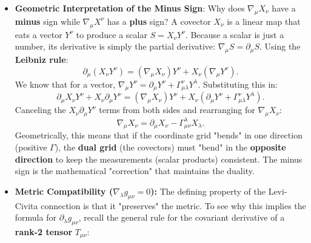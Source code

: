 \begin{solution}
\begin{itemize}
    \item \textbf{Geometric Interpretation of the Minus Sign}:
    Why does $\nabla_\mu X_\nu$ have a \textbf{minus} sign while $\nabla_\mu X^\nu$ has a \textbf{plus} sign? 
    A covector $X_\nu$ is a linear map that eats a vector $Y^\nu$ to produce a scalar $S = X_\nu Y^\nu$. Because a scalar is just a number, its derivative is simply the partial derivative: $\nabla_\mu S = \partial_\mu S$.
    Using the \textbf{Leibniz rule}:
    \[ \partial_\mu (X_\nu Y^\nu) = (\nabla_\mu X_\nu) Y^\nu + X_\nu (\nabla_\mu Y^\nu). \]
    We know that for a vector, $\nabla_\mu Y^\nu = \partial_\mu Y^\nu + \Gamma^\nu_{\mu\lambda} Y^\lambda$. Substituting this in:
    \[ \partial_\mu X_\nu Y^\nu + X_\nu \partial_\mu Y^\nu = (\nabla_\mu X_\nu) Y^\nu + X_\nu (\partial_\mu Y^\nu + \Gamma^\nu_{\mu\lambda} Y^\lambda). \]
    Canceling the $X_\nu \partial_\mu Y^\nu$ terms from both sides and rearranging for $\nabla_\mu X_\nu$:
    \[ \nabla_\mu X_\nu = \partial_\mu X_\nu - \Gamma^\lambda_{\mu\nu} X_\lambda. \]
    Geometrically, this means that if the coordinate grid "bends" in one direction (positive $\Gamma$), the \textbf{dual grid} (the covectors) must "bend" in the \textbf{opposite direction} to keep the measurements (scalar products) consistent. The minus sign is the mathematical "correction" that maintains the duality.
    \item \textbf{Metric Compatibility ($\nabla_\lambda g_{\mu\nu} = 0$):}
    The defining property of the Levi-Civita connection is that it "preserves" the metric. To see why this implies the formula for $\partial_\lambda g_{\mu\nu}$, recall the general rule for the covariant derivative of a \textbf{rank-2 tensor} $T_{\mu\nu}$:
\end{itemize}
\end{solution}
